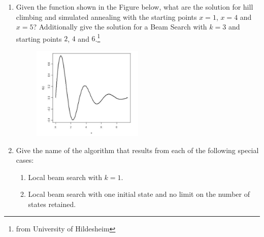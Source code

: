 \documentclass[a4paper]{article}
\newif\ifsol
\begin{document}
\begin{enumerate}
\item Given the function shown in the Figure below, what are the solution for hill climbing and simulated annealing with the starting points $x = 1$, $x = 4$ and $x = 5$? Additionally give the solution for a Beam Search with $k = 3$ and starting points $2$, $4$ and $6$.\footnote{from University of Hildesheim}

\begin{figure}[h]
\centering
\includegraphics[width=0.5\textwidth]{figs/climbing}
\end{figure}

\ifsol
    \textcolor{blue}{
    \begin{itemize}
    \item $x = 1$: HC: 1, SA: ? (but hopefully 1 or we have a really bad temperature function)
    \item $x = 4$: HC: 4, SA: ? (depends on temperature)
    \item $x = 5$: HC = 4, SA: ? (depends on temperature)
    \item $x = {2,4,6}$: BS: 4 
    \end{itemize}}
\else
    \vspace{7em}
\fi

\item Give the name of the algorithm that results from each of the following special cases:
\begin{enumerate}
\item Local beam search with $k = 1$.

\ifsol
    \textcolor{blue}{Local beam search with $k = 1$ is hill-climbing search.}
\else
    \vspace{5em}
\fi

\item Local beam search with one initial state and no limit on the number of states retained.

\ifsol
    \textcolor{blue}{Local beam search with one initial state and no limit on the number of states retained, resembles BFS in that it adds one complete layer of nodes before adding the next layer. Starting from one state, the algorithm would be essentially identical to BFS except that each layer is generated all at once.}
\else
    \vspace{5em}
\fi


\end{enumerate}
\end{enumerate}
\end{document}

